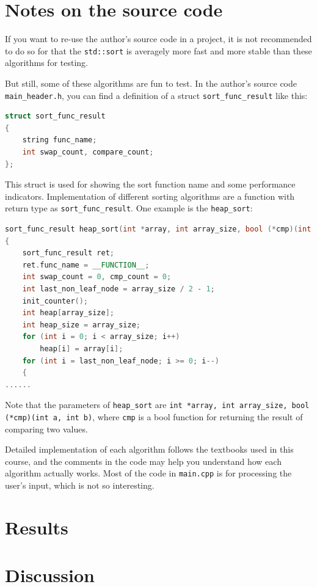 \documentclass[cn,black,12pt,normal]{elegantnote}
\begin{document}
\section{Notes on the source code}

If you want to re-use the author's source code in a project, it is not recommended to do so for that the \lstinline{std::sort} is averagely more fast and more stable than these algorithms for testing. 

But still, some of these algorithms are fun to test. In the author's source code \lstinline{main_header.h}, you can find a definition of a struct \lstinline{sort_func_result} like this:
\begin{lstlisting}[language = C++]
struct sort_func_result
{
	string func_name;
	int swap_count, compare_count;
};
\end{lstlisting}
This struct is used for showing the sort function name and some performance indicators. Implementation of different sorting algorithms are a function with return type as \lstinline{sort_func_result}. One example is the \lstinline{heap_sort}:
\begin{lstlisting}[language = C++]
sort_func_result heap_sort(int *array, int array_size, bool (*cmp)(int a, int b))
{
	sort_func_result ret;
	ret.func_name = __FUNCTION__;
	int swap_count = 0, cmp_count = 0;
	int last_non_leaf_node = array_size / 2 - 1;
	init_counter();
	int heap[array_size];
	int heap_size = array_size;
	for (int i = 0; i < array_size; i++)
		heap[i] = array[i];
	for (int i = last_non_leaf_node; i >= 0; i--)
	{
......
\end{lstlisting}
Note that the parameters of \lstinline{heap_sort} are \lstinline{int *array, int array_size, bool (*cmp)(int a, int b)}, where \lstinline{cmp} is a bool function for returning the result of comparing two values.

Detailed implementation of each algorithm follows the textbooks used in this course, and the comments in the code may help you understand how each algorithm actually works. Most of the code in \lstinline{main.cpp} is for processing the user's input, which is not so interesting.


\section{Results}



\section{Discussion}


\end{document}

